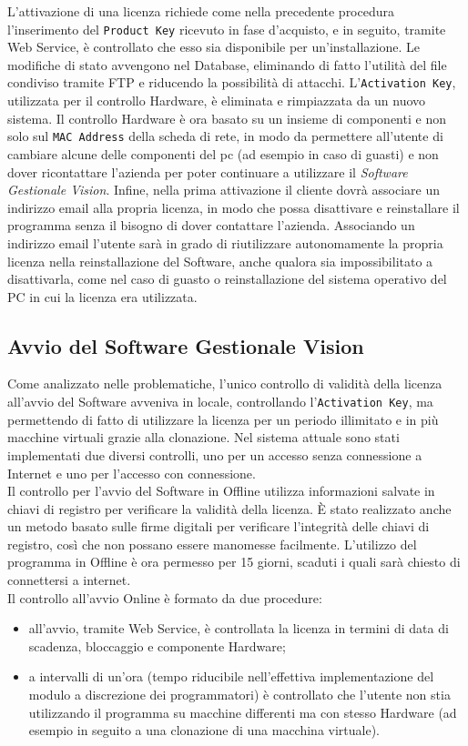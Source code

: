 L'attivazione di una licenza richiede come nella precedente procedura l'inserimento del \texttt{Product Key} ricevuto in fase d'acquisto, e in seguito, tramite Web Service, è controllato che esso sia disponibile per un'installazione. Le modifiche di stato avvengono nel Database, eliminando di fatto l'utilità del file condiviso tramite FTP e riducendo la possibilità di attacchi. L’\texttt{Activation Key}, utilizzata per il controllo Hardware, è eliminata e rimpiazzata da un nuovo sistema. Il controllo Hardware è ora basato su un insieme di componenti e non solo sul \texttt{MAC Address} della scheda di rete, in modo da permettere all’utente di cambiare alcune delle componenti del pc (ad esempio in caso di guasti) e non dover ricontattare l’azienda per poter continuare a utilizzare il \textit{Software Gestionale Vision}. 
Infine, nella prima attivazione il cliente dovrà associare un indirizzo email alla propria licenza, in modo che possa disattivare e reinstallare il programma senza il bisogno di dover contattare l’azienda. Associando un indirizzo email l'utente sarà in grado di riutilizzare autonomamente la propria licenza nella reinstallazione del Software, anche qualora sia impossibilitato a disattivarla, come nel caso di guasto o reinstallazione del sistema operativo del PC in cui la licenza era utilizzata.


\subsection{Avvio del Software Gestionale Vision}

Come analizzato nelle problematiche, l'unico controllo di validità della licenza all'avvio del Software avveniva in locale, controllando l'\texttt{Activation Key}, ma permettendo di fatto di utilizzare la licenza per un periodo illimitato e in più macchine virtuali grazie alla clonazione. Nel sistema attuale sono stati implementati due  diversi controlli, uno per un accesso senza connessione a Internet e uno per l’accesso con connessione.
\\
Il controllo per l’avvio del Software in Offline utilizza informazioni salvate in chiavi di registro per verificare la validità della licenza. È stato realizzato anche un metodo basato sulle firme digitali per verificare l’integrità delle chiavi di registro, così che non possano essere manomesse facilmente. L’utilizzo del programma in Offline è ora permesso per 15 giorni, scaduti i quali sarà chiesto di connettersi a internet.
\\
Il controllo all'avvio Online è formato da due procedure:
\begin{itemize}
\item all'avvio, tramite Web Service, è controllata la licenza in termini di data di scadenza, bloccaggio e componente Hardware;
\item a intervalli di un'ora (tempo riducibile nell'effettiva implementazione del modulo a discrezione dei programmatori) è controllato che l'utente non stia utilizzando il programma su macchine differenti ma con stesso Hardware (ad esempio in seguito a una clonazione di una macchina virtuale).

\end{itemize}

